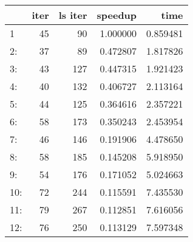 \begin{tabular}{lrrrr}
\toprule
{} &  iter &  ls iter &   speedup &      time \\
\midrule
1   &    45 &       90 &  1.000000 &  0.859481 \\
2:  &    37 &       89 &  0.472807 &  1.817826 \\
3:  &    43 &      127 &  0.447315 &  1.921423 \\
4:  &    40 &      132 &  0.406727 &  2.113164 \\
5:  &    44 &      125 &  0.364616 &  2.357221 \\
6:  &    58 &      173 &  0.350243 &  2.453954 \\
7:  &    46 &      146 &  0.191906 &  4.478650 \\
8:  &    58 &      185 &  0.145208 &  5.918950 \\
9:  &    54 &      176 &  0.171052 &  5.024663 \\
10: &    72 &      244 &  0.115591 &  7.435530 \\
11: &    79 &      267 &  0.112851 &  7.616056 \\
12: &    76 &      250 &  0.113129 &  7.597348 \\
\bottomrule
\end{tabular}
